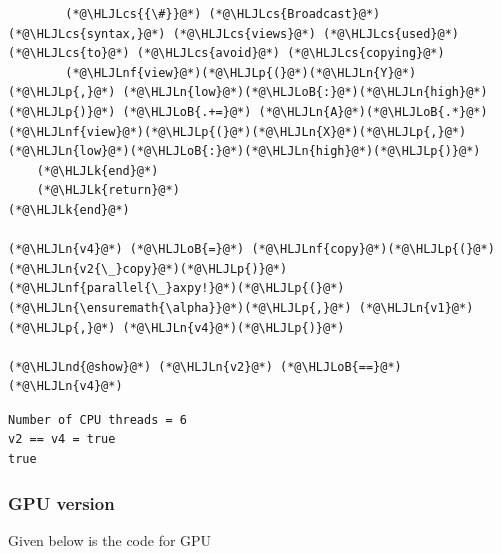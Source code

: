 \documentclass[12pt,a4paper]{article}
\newcommand{\HLJLk}[1]{\textcolor[RGB]{148,91,176}{\textbf{#1}}}
\newcommand{\HLJLn}[1]{#1}
\newcommand{\HLJLnd}[1]{\textcolor[RGB]{214,102,97}{#1}}
\newcommand{\HLJLnf}[1]{\textcolor[RGB]{66,102,213}{#1}}
\newcommand{\HLJLoB}[1]{\textcolor[RGB]{102,102,102}{\textbf{#1}}}
\newcommand{\HLJLp}[1]{#1}
\newcommand{\HLJLcs}[1]{\textcolor[RGB]{153,153,119}{\textit{#1}}}
\begin{document}
\begin{lstlisting}
        (*@\HLJLcs{{\#}}@*) (*@\HLJLcs{Broadcast}@*) (*@\HLJLcs{syntax,}@*) (*@\HLJLcs{views}@*) (*@\HLJLcs{used}@*) (*@\HLJLcs{to}@*) (*@\HLJLcs{avoid}@*) (*@\HLJLcs{copying}@*)
        (*@\HLJLnf{view}@*)(*@\HLJLp{(}@*)(*@\HLJLn{Y}@*)(*@\HLJLp{,}@*) (*@\HLJLn{low}@*)(*@\HLJLoB{:}@*)(*@\HLJLn{high}@*)(*@\HLJLp{)}@*) (*@\HLJLoB{.+=}@*) (*@\HLJLn{A}@*)(*@\HLJLoB{.*}@*)(*@\HLJLnf{view}@*)(*@\HLJLp{(}@*)(*@\HLJLn{X}@*)(*@\HLJLp{,}@*) (*@\HLJLn{low}@*)(*@\HLJLoB{:}@*)(*@\HLJLn{high}@*)(*@\HLJLp{)}@*)
    (*@\HLJLk{end}@*)
    (*@\HLJLk{return}@*)
(*@\HLJLk{end}@*)

(*@\HLJLn{v4}@*) (*@\HLJLoB{=}@*) (*@\HLJLnf{copy}@*)(*@\HLJLp{(}@*)(*@\HLJLn{v2{\_}copy}@*)(*@\HLJLp{)}@*)
(*@\HLJLnf{parallel{\_}axpy!}@*)(*@\HLJLp{(}@*)(*@\HLJLn{\ensuremath{\alpha}}@*)(*@\HLJLp{,}@*) (*@\HLJLn{v1}@*)(*@\HLJLp{,}@*) (*@\HLJLn{v4}@*)(*@\HLJLp{)}@*)

(*@\HLJLnd{@show}@*) (*@\HLJLn{v2}@*) (*@\HLJLoB{==}@*) (*@\HLJLn{v4}@*)
\end{lstlisting}

\begin{lstlisting}
Number of CPU threads = 6
v2 == v4 = true
true
\end{lstlisting}


\subsubsection{GPU version}
Given below is the code for GPU
\end{document}
